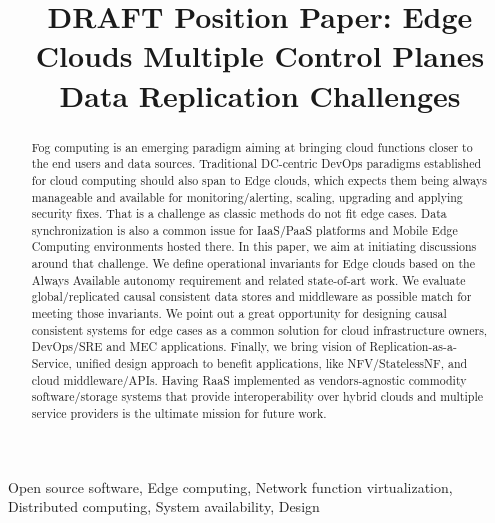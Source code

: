\documentclass[conference]{IEEEtran}
\begin{document}
\title{DRAFT Position Paper: Edge Clouds Multiple Control Planes Data Replication
Challenges\\
}

\author{
\IEEEauthorblockA{\textit{} \\
\textit{}\\
\\
}
}

\maketitle

\begin{abstract}
Fog computing is an emerging paradigm aiming at bringing cloud functions closer
to the end users and data sources. Traditional DC-centric DevOps paradigms
established for cloud computing should also span to Edge clouds, which expects
them being always manageable and available for monitoring/alerting, scaling,
upgrading and applying security fixes. That is a challenge as classic methods
do not fit edge cases. Data synchronization is also a common issue for
IaaS/PaaS platforms and Mobile Edge Computing environments hosted there. In
this paper, we aim at initiating discussions around that challenge. We define
operational invariants for Edge clouds based on the Always Available autonomy
requirement and related state-of-art work. We evaluate global/replicated causal
consistent data stores and middleware as possible match for meeting those
invariants. We point out a great opportunity for designing causal consistent
systems for edge cases as a common solution for cloud infrastructure owners,
DevOps/SRE and MEC applications. Finally, we bring vision of
Replication-as-a-Service, unified design approach to benefit applications, like
NFV/StatelessNF, and cloud middleware/APIs. Having RaaS implemented as
vendors-agnostic commodity software/storage systems that provide
interoperability over hybrid clouds and multiple service providers is the
ultimate mission for future work.
\end{abstract}

\begin{IEEEkeywords}
Open source software, Edge computing, Network function virtualization,
Distributed computing, System availability, Design
\end{IEEEkeywords}
\end{document}
